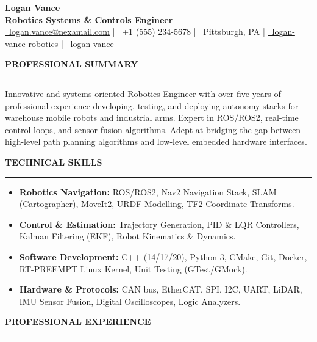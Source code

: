 \documentclass[10pt,letterpaper]{article}
\newcommand{\cvsection}[1]{%
  \vspace{6pt}%
  \phantomsection
  {\color{accent}\large\bfseries\MakeUppercase{#1}}%
  \vspace{1pt}%
  \par\noindent\textcolor{accent}{\rule{\linewidth}{1pt}}%
  \vspace{4pt}%
}
\begin{document}
\fontsize{9.5pt}{11.5pt}\selectfont
\color{primary}
\pagestyle{empty}

\begin{center}
  {\Huge\bfseries\color{accent} Logan Vance} \\
  \vspace{2pt}
  {\large\bfseries\color{secondary} Robotics Systems \& Controls Engineer} \\
  \vspace{4pt}
  \small
  \href{mailto:logan.vance@nexamail.com}{\faEnvelope\ logan.vance@nexamail.com} \quad \textcolor{secondary}{|} \quad
  \faPhone\ +1 (555) 234-5678 \quad \textcolor{secondary}{|} \quad
  \faMapMarker\ Pittsburgh, PA \quad \textcolor{secondary}{|} \quad
  \href{https://linkedin.com/in/logan-vance-robotics}{\faLinkedin\ logan-vance-robotics} \quad \textcolor{secondary}{|} \quad
  \href{https://github.com/logan-vance}{\faGithub\ logan-vance}
\end{center}
\vspace{-8pt}

\cvsection{Professional Summary}
\noindent
Innovative and systems-oriented Robotics Engineer with over five years of professional experience developing, testing, and deploying autonomy stacks for warehouse mobile robots and industrial arms. Expert in ROS/ROS2, real-time control loops, and sensor fusion algorithms. Adept at bridging the gap between high-level path planning algorithms and low-level embedded hardware interfaces.

\cvsection{Technical Skills}
\begin{itemize}[after=\vspace{-2pt}]
  \item \textbf{Robotics Navigation:} ROS/ROS2, Nav2 Navigation Stack, SLAM (Cartographer), MoveIt2, URDF Modelling, TF2 Coordinate Transforms.
  \item \textbf{Control \& Estimation:} Trajectory Generation, PID \& LQR Controllers, Kalman Filtering (EKF), Robot Kinematics \& Dynamics.
  \item \textbf{Software Development:} C++ (14/17/20), Python 3, CMake, Git, Docker, RT-PREEMPT Linux Kernel, Unit Testing (GTest/GMock).
  \item \textbf{Hardware \& Protocols:} CAN bus, EtherCAT, SPI, I2C, UART, LiDAR, IMU Sensor Fusion, Digital Oscilloscopes, Logic Analyzers.
\end{itemize}

\cvsection{Professional Experience}
\end{document}
